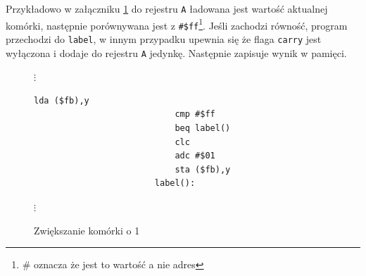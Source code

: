 \documentclass[a4paper,12pt]{article}
\begin{document}
    Przykładowo w załączniku \ref{kod:inc} do rejestru \texttt{A} ładowana jest wartość aktualnej komórki, następnie porównywana jest z \texttt{\#\$ff}\footnote{\# oznacza że jest to wartość a nie adres}. Jeśli zachodzi równość, program przechodzi do \texttt{label}, w innym przypadku upewnia się że flaga \texttt{carry} jest wyłączona i dodaje do rejestru \texttt{A} jedynkę. Następnie zapisuje wynik w pamięci.

    \begin{figure}[h]
        $\vdots$
        \centering
        \vspace{-3mm}
        \begin{lstlisting}[basicstyle=\ttfamily,morekeywords={cpy,bne,dec,dey}]
                            lda ($fb),y
                            cmp #$ff
                            beq label()
                            clc
                            adc #$01
                            sta ($fb),y
                        label():
        \end{lstlisting}
        \vspace{-3mm}
        $\vdots$
        \centering
        \caption{Zwiększanie komórki o 1}
        \label{kod:inc}
    \end{figure}
    
\end{document}
